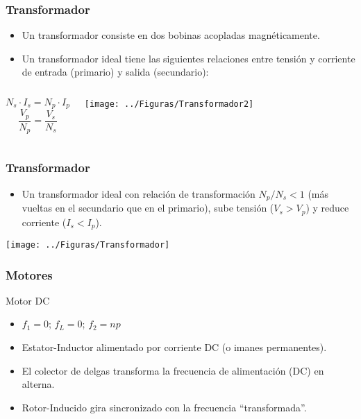 \documentclass[serif, xcolor=dvipsnames]{beamer}
\begin{document}
\begin{frame}
  \frametitle{Transformador}
  \begin{itemize}
  \item Un transformador consiste en dos bobinas acopladas
    magnéticamente.
  \item Un transformador ideal tiene las siguientes relaciones entre
    tensión y corriente de entrada (primario) y salida
    (secundario):\end{itemize}
  \begin{columns}[c]%


    \column{3cm}


\[
N_{s}\cdot I_{s}=N_{p}\cdot I_{p}
\]
\[
\frac{V_{p}}{N_{p}}=\frac{V_{s}}{N_{s}}
\]



\column{5cm}


\begin{center}
  \texttt{[image: ../Figuras/Transformador2]}
  \par\end{center}


\end{columns}%

\end{frame}
\begin{frame}
  \frametitle{Transformador}
  \begin{itemize}
  \item Un transformador ideal con relación de transformación
    $N_{p}/N_{s}<1$ (más vueltas en el secundario que en el primario),
    sube tensión ($V_{s}>V_{p}$) y reduce corriente ($I_{s}<I_{p}$).
  \end{itemize}
  \begin{center}
    \texttt{[image: ../Figuras/Transformador]}
    \par\end{center}


\end{frame}
\begin{frame}
  \frametitle{Motores}
  \begin{block} {Motor DC}
    \begin{itemize}
    \item $f_{1}=0$; $f_{L}=0$;\textrm{ $f_{2}=np$}
    \item Estator-Inductor alimentado por corriente DC (o imanes
      permanentes).
    \item El colector de delgas transforma la frecuencia de
      alimentación (DC) en alterna.
    \item Rotor-Inducido gira sincronizado con la frecuencia
      {}``transformada''.
    \end{itemize}
  \end{block}

\end{frame}
\end{document}
